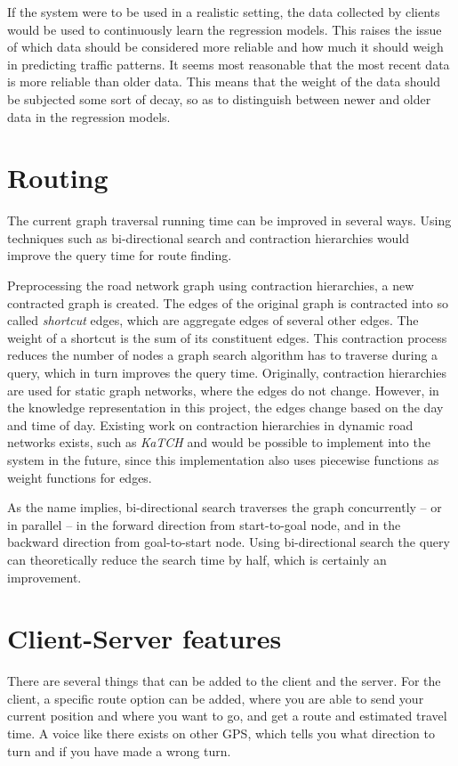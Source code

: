 If the system were to be used in a realistic setting, the data collected by clients would be used to continuously learn the regression models. This raises the issue of which data should be considered more reliable and how much it should weigh in predicting traffic patterns. It seems most reasonable that the most recent data is more reliable than older data. This means that the weight of the data should be subjected some sort of decay, so as to distinguish between newer and older data in the regression models.

\section{Routing}
The current graph traversal running time can be improved in several ways. Using techniques such as bi-directional search and contraction hierarchies would improve the query time for route finding.

Preprocessing the road network graph using contraction hierarchies, a new contracted graph is created. The edges of the original graph is contracted into so called \emph{shortcut} edges, which are aggregate edges of  several other edges. The weight of a shortcut is the sum of its constituent edges. This contraction process reduces the number of nodes a graph search algorithm has to traverse during a query, which in turn improves the query time.
Originally, contraction hierarchies are used for static graph networks, where the edges do not change. However, in the knowledge representation in this project, the edges change based on the day and time of day. Existing work on contraction hierarchies in dynamic road networks exists, such as \emph{KaTCH}\cite{KaTCH,KaTCHi} and would be possible to implement into the system in the future, since this implementation also uses piecewise functions as weight functions for edges.

As the name implies, bi-directional search traverses the graph concurrently -- or in parallel -- in the forward direction from start-to-goal node, and in the backward direction from goal-to-start node. Using bi-directional search the query can theoretically reduce the search time by half, which is certainly an improvement.

\section{Client-Server features}
There are several things that can be added to the client and the server. For the client, a specific route option can be added, where you are able to send your current position and where you want to go, and get a route and estimated travel time. A voice like there exists on other GPS, which tells you what direction to turn and if you have made a wrong turn.

